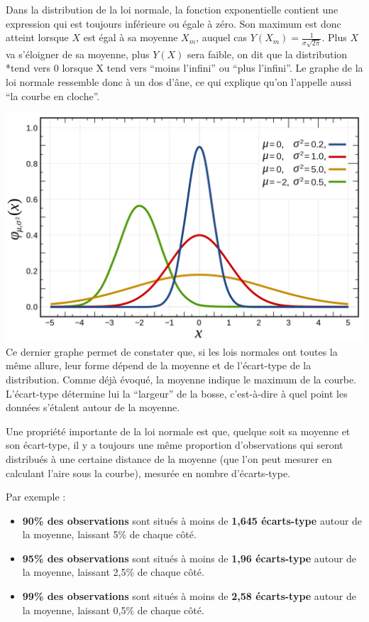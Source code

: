 \documentclass[
]{book}
\providecommand{\tightlist}{%
  \setlength{\itemsep}{0pt}\setlength{\parskip}{0pt}}
\begin{document}
Dans la distribution de la loi normale, la fonction exponentielle contient une expression qui est toujours inférieure ou égale à zéro. Son maximum est donc atteint lorsque \(X\) est égal à sa moyenne \(X_m\), auquel cas \(Y(X_m) = \frac{1}{ \sigma \sqrt{2\pi}}\). Plus \(X\) va s'éloigner de sa moyenne, plus \(Y(X)\) sera faible, on dit que la distribution *tend vers 0 lorsque X tend vers ``moins l'infini'' ou ``plus l'infini''. Le graphe de la loi normale ressemble donc à un dos d'âne, ce qui explique qu'on l'appelle aussi ``la courbe en cloche''.

\includegraphics{images/loisnormales.png} Ce dernier graphe permet de constater que, si les lois normales ont toutes la même allure, leur forme dépend de la moyenne et de l'écart-type de la distribution. Comme déjà évoqué, la moyenne indique le maximum de la courbe. L'écart-type détermine lui la ``largeur'' de la bosse, c'est-à-dire à quel point les données s'étalent autour de la moyenne.

Une propriété importante de la loi normale est que, quelque soit sa moyenne et son écart-type, il y a toujours une même proportion d'observations qui seront distribués à une certaine distance de la moyenne (que l'on peut mesurer en calculant l'aire sous la courbe), mesurée en nombre d'écarts-type.

Par exemple :

\begin{itemize}
\tightlist
\item
  \textbf{90\% des observations} sont situés à moins de \textbf{1,645 écarts-type} autour de la moyenne, laissant 5\% de chaque côté.
\item
  \textbf{95\% des observations} sont situés à moins de \textbf{1,96 écarts-type} autour de la moyenne, laissant 2,5\% de chaque côté.
\item
  \textbf{99\% des observations} sont situés à moins de \textbf{2,58 écarts-type} autour de la moyenne, laissant 0,5\% de chaque côté.
\end{itemize}
\end{document}
